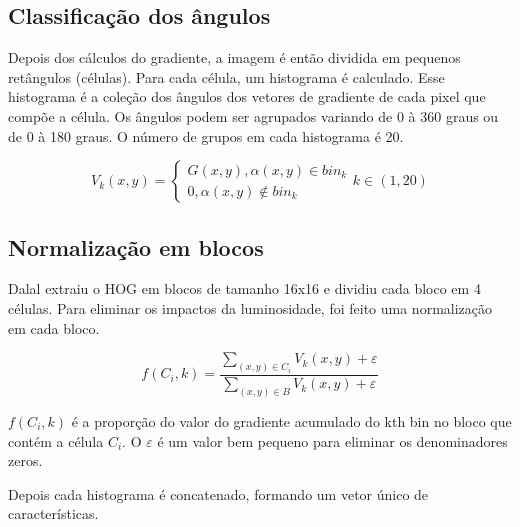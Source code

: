 \subsection{Classificação dos ângulos}

Depois dos cálculos do gradiente, a imagem é então dividida em pequenos retângulos (células). Para cada célula, um histograma é calculado. Esse histograma é a coleção dos ângulos dos vetores de gradiente de cada pixel que compõe a célula. Os ângulos podem ser agrupados variando de 0 à 360 graus ou de 0 à 180 graus. O número de grupos em cada histograma é 20.

\[
V_{k}(x,y) = \left\{\begin{matrix}
G(x,y), \alpha (x,y)  \in bin_{k}\\ 
0, \alpha (x,y) \notin bin_{k}
\end{matrix}\right. k \in (1,20)
\]

\subsection{Normalização em blocos}

Dalal extraiu o HOG em blocos de tamanho 16x16 e dividiu cada bloco em 4 células. Para eliminar os impactos da luminosidade, foi feito uma normalização em cada bloco.

\[
f(C_{i},k) = \frac
{\sum_{(x,y) \in C_i}V_k(x,y) + \varepsilon}
{\sum_{(x,y) \in B}V_k(x,y) + \varepsilon}
\]

\(f(C_i,k)\) é a proporção do valor do gradiente acumulado do kth bin no bloco que contém a célula \(C_i\). O \(\varepsilon\) é um valor bem pequeno para eliminar os denominadores zeros.

Depois cada histograma é concatenado, formando um vetor único de características.

%



